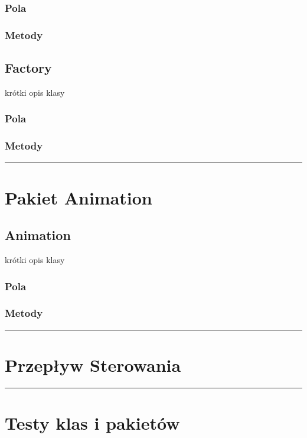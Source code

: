 \documentclass[a4paper,11pt]{article}
\newcommand{\linia}{\rule{\linewidth}{0.4mm}}
\begin{document}
\subsubsection{Pola}

\subsubsection{Metody}




\subsection{Factory}
krótki opis klasy
\subsubsection{Pola}

\subsubsection{Metody}

\noindent\linia

\section{Pakiet Animation}

\subsection{Animation}
krótki opis klasy
\subsubsection{Pola}

\subsubsection{Metody}

\noindent\linia
\section{Przepływ Sterowania}




\noindent\linia
\section{Testy klas i pakietów}
\end{document}
